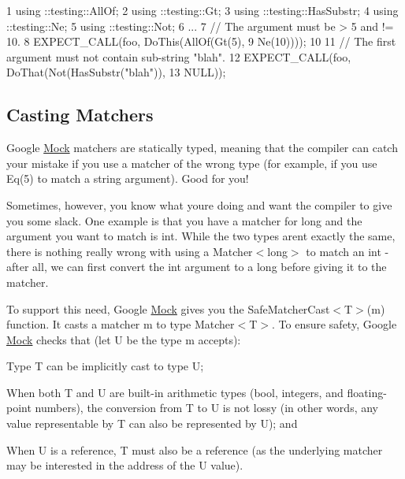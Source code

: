 \begin{DoxyCode}
1 using ::testing::AllOf;
2 using ::testing::Gt;
3 using ::testing::HasSubstr;
4 using ::testing::Ne;
5 using ::testing::Not;
6 ...
7   // The argument must be > 5 and != 10.
8   EXPECT\_CALL(foo, DoThis(AllOf(Gt(5),
9                                 Ne(10))));
10 
11   // The first argument must not contain sub-string "blah".
12   EXPECT\_CALL(foo, DoThat(Not(HasSubstr("blah")),
13                           NULL));
\end{DoxyCode}


\subsection*{Casting Matchers}

Google \hyperlink{classMock}{Mock} matchers are statically typed, meaning that the compiler can catch your mistake if you use a matcher of the wrong type (for example, if you use {\ttfamily Eq(5)} to match a {\ttfamily string} argument). Good for you!

Sometimes, however, you know what you\textquotesingle{}re doing and want the compiler to give you some slack. One example is that you have a matcher for {\ttfamily long} and the argument you want to match is {\ttfamily int}. While the two types aren\textquotesingle{}t exactly the same, there is nothing really wrong with using a {\ttfamily Matcher$<$long$>$} to match an {\ttfamily int} -\/ after all, we can first convert the {\ttfamily int} argument to a {\ttfamily long} before giving it to the matcher.

To support this need, Google \hyperlink{classMock}{Mock} gives you the {\ttfamily Safe\+Matcher\+Cast$<$T$>$(m)} function. It casts a matcher {\ttfamily m} to type {\ttfamily Matcher$<$T$>$}. To ensure safety, Google \hyperlink{classMock}{Mock} checks that (let {\ttfamily U} be the type {\ttfamily m} accepts)\+:


\begin{DoxyEnumerate}
\item Type {\ttfamily T} can be implicitly cast to type {\ttfamily U};
\end{DoxyEnumerate}
\begin{DoxyEnumerate}
\item When both {\ttfamily T} and {\ttfamily U} are built-\/in arithmetic types ({\ttfamily bool}, integers, and floating-\/point numbers), the conversion from {\ttfamily T} to {\ttfamily U} is not lossy (in other words, any value representable by {\ttfamily T} can also be represented by {\ttfamily U}); and
\end{DoxyEnumerate}
\begin{DoxyEnumerate}
\item When {\ttfamily U} is a reference, {\ttfamily T} must also be a reference (as the underlying matcher may be interested in the address of the {\ttfamily U} value).
\end{DoxyEnumerate}

